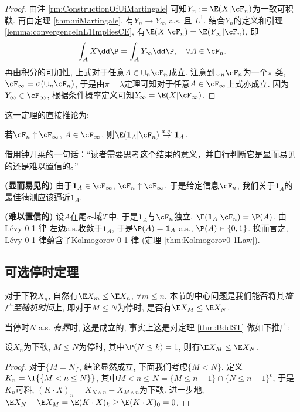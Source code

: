 \documentclass[a4paper, 10pt]{ctexart}
\begin{document}
\begin{proof}
	由注 \ref{rm:ConstructionOfUiMartingale} 可知$Y_n:=\E(X|\cF_n)$为一致可积鞅. 
	再由定理 \ref{thm:uiMartingale}, 有$Y_n \to Y_{\infty}$ a.s. 且 $L^1$. 
	结合$Y_n$的定义和引理 \ref{lemma:convergenceInL1ImpliesCE}, 有$\E(X|\cF_n) = \E(Y_{\infty}|\cF_n)$, 即
	\begin{equation*}
		\int_A X \dd \P = \int_A Y_{\infty} \dd \P, \quad \forall A \in \cF_n. 
	\end{equation*}
	再由积分的可加性, 上式对于任意$A \in \cup_n \cF_n$成立. 
	注意到$\cup_n \cF_n$为一个$\pi$-类, $\cF_{\infty} = \sigma( \cup_n \cF_n)$, 于是由$\pi - \lambda$定理可知对于任意$A \in \cF_{\infty}$上式亦成立. 
	因为$Y_{\infty} \in \cF_{\infty}$, 根据条件概率定义可知$Y_{\infty} = \E(X|\cF_{\infty})$. 
\end{proof}

这一定理的直接推论为: 
\begin{theorem}[Lévy $0-1$ 律]\label{thm:Lévy0-1Law}
	若$\cF_n \uparrow \cF_{\infty}$, $A \in \cF_{\infty}$, 则$\E(\mathbf 1_A |\cF_n) \stackrel{a.s.}{\to} \mathbf 1_A$. 
\end{theorem}

\begin{remark}
	借用钟开莱的一句话：“读者需要思考这个结果的意义，并自行判断它是显而易见的还是难以置信的。”
	
	\textbf{(显而易见的)}
	由于$\mathbf 1_A \in \cF_{\infty}$, $\cF_n \uparrow \cF_{\infty}$, 于是给定信息$\cF_n$, 我们关于$\mathbf 1_A$的最佳猜测应该逼近$\mathbf 1_A$. 
	
	\textbf{(难以置信的)}
	设$A$在尾$\sigma$-域$\mathcal T$中, 于是$\mathbf 1_A$与$\cF_n$独立, $\E(\mathbf 1_A|\cF_n) = \P(A)$. 
	由Lévy 0-1 律 左边a.s.收敛于$\mathbf 1_A$, 于是$\P(A) = \mathbf 1_A$ a.s., $\P(A) \in \{0, 1\}$.
	换而言之, Lévy 0-1 律蕴含了Kolmogorov 0-1 律 (定理 \ref{thm:Kolmogorov0-1Law}). 
\end{remark}

\subsection{可选停时定理}

对于下鞅$X_n$, 自然有$\E X_m \leq \E X_n$, $\forall m \leq n$. 
本节的中心问题是我们能否将其\emph{推广至随机时间}上, 即对于$M \leq N$为停时, 是否有$\E X_M \leq \E X_N$. 

当停时$N$ a.s. \emph{有界}时, 这是成立的, 事实上这是对定理 \ref{thm:BddST} 做如下推广: 
\begin{example}
	设$X_n$为下鞅, $M \leq N$为停时, 其中$\P(N \leq k) = 1$, 则有$\E X_M \leq \E X_N$. 
\end{example}
\begin{proof}
	对于$\{M = N \}$, 结论显然成立, 下面我们考虑$\{M < N\}$. 
	定义$K_n = \I{\{M < n \leq N\}}$, 其中${M < n \leq N} = \{M \leq n-1\} \cap \{N \leq n-1\}^c$, 于是$K_n$可料, $(K \cdot X)_n = X_{N \wedge n} - X_{M \wedge n}$为下鞅. 
	进一步地, $\E X_N - \E X_M =  \E(K \cdot X)_k \geq \E (K \cdot X)_0 = 0$. 
\end{proof}
\end{document}
